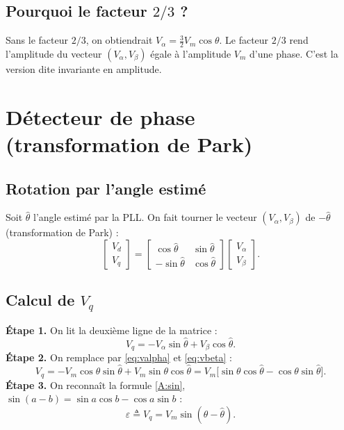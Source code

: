 \documentclass[11pt,a4paper]{article}
\numberwithin{equation}{section}
\theoremstyle{plain}
\theoremstyle{definition}
\theoremstyle{remark}
\newcommand{\hth}{\hat{\theta}}
\begin{document}
\subsection{Pourquoi le facteur $2/3$ ?}
Sans le facteur $2/3$, on obtiendrait $V_\alpha = \frac32V_m\cos\theta$. Le facteur $2/3$ rend
l'amplitude du vecteur $(V_\alpha,V_\beta)$ égale à l'amplitude $V_m$ d'une phase.
C'est la version dite \og invariante en amplitude\fg.

\section{Détecteur de phase (transformation de Park)}

\subsection{Rotation par l'angle estimé}
Soit $\hth$ l'angle estimé par la PLL. On fait tourner le vecteur $(V_\alpha,V_\beta)$ de $-\hth$
(transformation de Park) :
\begin{equation}
\begin{bmatrix}V_d\\V_q\end{bmatrix}
=\begin{bmatrix}\cos\hth&\sin\hth\\-\sin\hth&\cos\hth\end{bmatrix}
\begin{bmatrix}V_\alpha\\V_\beta\end{bmatrix}.
\end{equation}

\subsection{Calcul de $V_q$}
\textbf{Étape 1.} On lit la deuxième ligne de la matrice :
\begin{equation}
V_q = -V_\alpha\sin\hth + V_\beta\cos\hth .
\end{equation}
\textbf{Étape 2.} On remplace par \eqref{eq:valpha} et \eqref{eq:vbeta} :
\begin{equation}
V_q = -V_m\cos\theta\sin\hth + V_m\sin\theta\cos\hth
    = V_m\big[\sin\theta\cos\hth-\cos\theta\sin\hth\big].
\end{equation}
\textbf{Étape 3.} On reconnaît la formule \eqref{A:sin}, $\sin(a-b)=\sin a\cos b-\cos a\sin b$ :
\begin{equation}\label{eq:eps}
\boxed{\varepsilon \triangleq V_q = V_m\sin(\theta-\hth).}
\end{equation}
\end{document}
